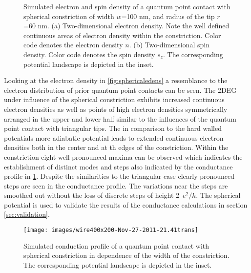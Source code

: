 \begin{figure}[h!]
  \hspace{14pt}
  \hspace{4pt}
  \caption{Simulated electron and spin density of a quantum point contact with spherical constriction of width $w$=100 nm, and radius of the tip $r$=60 nm. (a) Two-dimensional electron density. Note the well defined continuous areas of electron density within the constriction. Color code denotes the electron density $n$. (b) Two-dimensional spin density. Color code denotes the spin density $s_z$. The corresponding potential landscape is depicted in the inset.}
\end{figure}
Looking at the electron density in \cref{fig:sphericaledens} a resemblance to the electron distribution of prior quantum point contacts can be seen. The 2DEG under influence of the spherical constriction exhibits increased continuous electron densities as well as points of high electron densities symmetrically arranged in the upper and lower half similar to the influences of the quantum point contact with triangular tips.  The in comparison to the hard walled potentials more adiabatic potential leads to extended continuous electron densities both in the center and at th edges of the constriction. Within the constriction eight well pronounced maxima can be observed which indicates the establishment of distinct modes and steps also indicated by the conductance profile in \cref{fig:sphericaltrans}. Despite the similarities to the triangular case clearly pronounced steps are seen in the conductance profile. The variations near the steps are smoothed out without the loss of discrete steps of height 2~$e^2/h$.  The spherical potential is used to validate the results of the conductance calculations in section \ref{sec:validation}.\par
\begin{figure}[h]
  \centering
  \texttt{[image: images/wire400x200-Nov-27-2011-21.41trans]}
  \caption{Simulated conduction profile of a quantum point contact with spherical constriction in dependence of the width of the constriction. The corresponding potential landscape is depicted in the inset.}\label{fig:sphericaltrans}
\end{figure}

